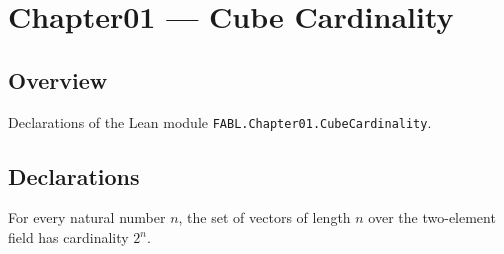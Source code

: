 \chapter{Chapter01 — Cube Cardinality}
\section{Overview}

Declarations of the Lean module \texttt{FABL.Chapter01.CubeCardinality}.

\section{Declarations}

\begin{theorem}
\leanok
{}
For every natural number $n$, the set of vectors of length $n$ over the two-element
field has cardinality $2^n$.
\end{theorem}
